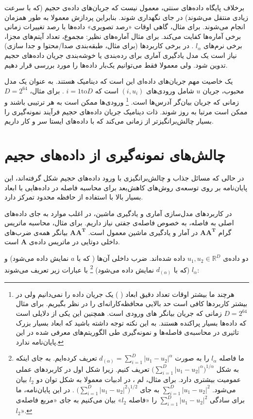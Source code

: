 برخلاف پایگاه‌ داده‌های سنتی، معمول نیست که جریان‌های داده‌ی حجیم (که با سرعت زیادی منتقل می‌شوند) در جای نگهداری شوند. بنابراین پردازش معمولا به طور همزمان انجام می‌شوند. برای مثال، گاهی اوقات «رصد تصویری» داده‌ها با رصد تغییرات زمانی برخی آماره‌ها کفایت می‌کند. برای مثال آماره‌های نظیر: مجموع، تعداد آیتم‌های مجزا، برخی نرم‌های 
$l_\alpha$
. در برخی کاربردها (برای مثال، طبقه‌بندی صدا/محتوا و جدا سازی) نیاز است یک مدل یادگیری آماری برای رده‌بندی%
یا خوشه‌بندی%
جریان داده‌های حجیم تدوین شود. ولی معمولا فقط می‌توانیم یک‌بار داده‌ها را مورد بررسی قرار دهیم.

یک خاصیت مهم جریان‌های داده‌ای این است که دینامیک هستند. به عنوان یک مدل محبوب، جریان 
$u$
شامل ورودی‌های 
$(i, u_i)$
است که 
$i = 1 \mathrm{to} D$
. برای مثال،
$D = 2^{64}$
زمانی که جریان بیان‌گر 
آدرس‌ها است.%
\footnote{
هرچند ما بیشتر اوقات تعداد دقیق ابعاد (%
%
) یک جریان داده را نمی‌دانیم ولی در بیشتر کاربردها کافی است حد بالایی محافظه‌کارانه‌ای را در نظر بگیریم. برای مثال 
$D = 2^{64}$
زمانی که جریان بیانگر 
های ورودی است. همچنین این یکی از دلایلی است که داده‌ها بسیار پراکنده هستند. به این نکته توجه داشته باشید که ابعاد بسیار بزرک تاثیری در محاسبه‌ی فاصله‌ها و نمونه‌گیری طی الگوریتم‌های معرفی شده در این پایان‌نامه ندارد.
}
ورودی‌ها ممکن است به هر ترتیبی باشند و ممکن است مرتبا به روز شوند. ذات دینامیک جریان داده‌های حجیم فرآیند نمونه‌گیری را بسیار چالش‌برانگیزتر از زمانی ‌می‌کند که با داده‌های ایستا سر و کار داریم.

\section{
چالش‌های نمونه‌گیری از داده‌های حجیم
}

در حالی که مسائل جذاب و چالش‌برانگیزی با ورود داده‌های حجیم شکل گرفته‌اند، این پایان‌نامه بر روی توسعه‌ی روش‌های کاهش‌بعد برای محاسبه فاصله در داده‌هایی با ابعاد بسیار بالا با استفاده از حافظه محدود تمرکز دارد.

در کاربردهای مدل‌سازی آماری و یادگیری ماشین، در اغلب موارد به جای داده‌های اصلی به فاصله، به خصوص فاصله‌ی جفتی نیاز داریم. برای مثال، محاسبه ماتریس گرام%
$\mathbf{AA^T}$
در آمار و یادگیری ماشین معمول است. 
$\mathbf{AA^T}$
بیانگر همه‌ی ضرب‌های داخلی دوتایی در ماتریس داده‌ی 
‌$\mathbf{A}$
است.

دو داده‌ی 
$u_1, u_2 \in \mathbb{R}^D$
داده شده‌اند. ضرب داخلی آن‌ها ( که با 
$a$
نمایش داده می‌شود) و 
$l_\alpha$
(که با 
$d_{(\alpha)}$
نمایش داده می‌شود)%
\footnote{
ما فاصله $l_\alpha$ را به صورت 
$d_{(\alpha)} = \sum_{i=1}^{D} \mathopen| u_1 - u_2 \mathclose|^\alpha$
تعریف کرده‌ایم. به جای اینکه به شکل
$\mathopen( \sum_{i=1}^{D} \mathopen| u_1 - u_2 \mathclose|^\alpha \mathclose)^{1/\alpha}$
تعریف کنیم. زیرا شکل اول در کاربردهای عملی عمومیت بیشتری دارد. برای مثال، لم 
، در ادبیات معمولا به شکل توان دو $l_2$ بیان می‌شود. 
$\sum_{i=1}^{D} \mathopen| u_1 - u_2 \mathclose|^2$
به جای 
$\mathopen( \sum_{i=1}^{D} \mathopen| u_1 - u_2 \mathclose|^2 \mathclose)^{1/2}$
. در این پایان‌نامه، ما برای سادگی 
$\sum_{i=1}^{D} \mathopen| u_1 - u_2 \mathclose|^2$
را «فاصله $l_2$» بیان می‌کنیم به جای «مربع فاصله‌ی $l_2$».
}
 با عبارات زیر تعریف می‌شوند:

